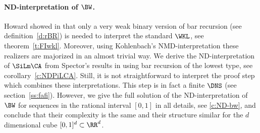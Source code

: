 \paragraph{ND-interpretation of $\BW$.}
Howard showed in \cite{Howard81} that only a very weak
binary version of bar recursion (see definition~\ref{d:rBR}) is needed 
to interpret the standard $\WKL$, see theorem~\ref{t:FIwkl}. Moreover,
using Kohlenbach's NMD-interpretation these realizers are majorized in an almost
 trivial way. 
We derive the ND-interpretation of $\SiLm\CA$ from Spector's results in \cite{Spector62} 
using bar recursion of the lowest type, see corollary~\ref{c:NDPiLCA}.
Still, it is not straightforward to interpret the proof step which combines these 
interpretations. This step is in fact a finite $\DNS$ (see section~\ref{ss:fafi}). 
However, we give the full solution of the ND-interpretation of $\BW$ for
sequences in the rational interval $[0,1]$ in all details, see \ref{c:ND-bw}, and 
conclude that their complexity is the same and their structure similar for the
$d$\nbd dimensional cube $[0,1]^d\subset\RR^d$.

